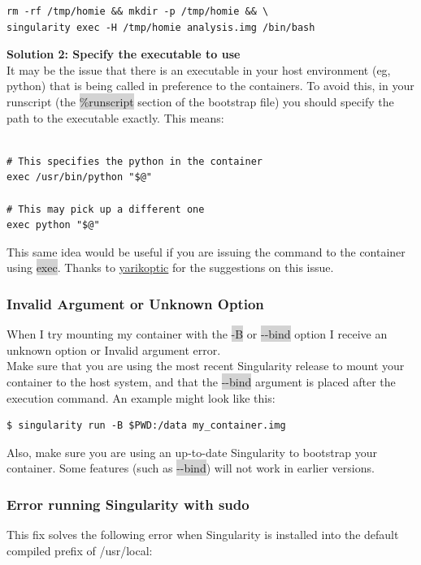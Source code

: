 \documentclass[a4paper]{article}
\begin{document}
\begin{lstlisting}[frame=single]
rm -rf /tmp/homie && mkdir -p /tmp/homie && \
singularity exec -H /tmp/homie analysis.img /bin/bash
\end{lstlisting}

\textbf{Solution 2: Specify the executable to use}\\[0.1in]
It may be the issue that there is an executable in your host environment (eg, python) that is being called in preference to the containers. To avoid this, in your runscript (the \colorbox{lightgray}{\%runscript} section of the bootstrap file) you should specify the path to the executable exactly. This means:\\[0.1in]

\begin{lstlisting}[frame=single]
%runscript

# This specifies the python in the container
exec /usr/bin/python "$@"

# This may pick up a different one
exec python "$@"
\end{lstlisting}

This same idea would be useful if you are issuing the command to the container using \colorbox{lightgray}{exec}. Thanks to \href{https://github.com/yarikoptic}{yarikoptic} for the suggestions on this issue.

\subsubsection{Invalid Argument or Unknown Option}
When I try mounting my container with the \colorbox{lightgray}{-B} or \colorbox{lightgray}{-{}-bind} option I receive an unknown option or Invalid argument error.\\[0.1in]

Make sure that you are using the most recent Singularity release to mount your container to the host system, and that the \colorbox{lightgray}{-{}-bind} argument is placed after the execution command. An example might look like this:

\begin{lstlisting}[frame=single]
$ singularity run -B $PWD:/data my_container.img
\end{lstlisting}

Also, make sure you are using an up-to-date Singularity to bootstrap your container. Some features (such as \colorbox{lightgray}{-{}-bind}) will not work in earlier versions.

\subsubsection{Error running Singularity with sudo}
This fix solves the following error when Singularity is installed into the default compiled prefix of /usr/local:
\end{document}
